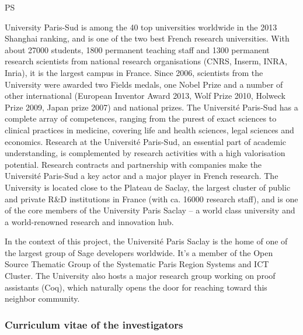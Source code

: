 \begin{sitedescription}{PS}

University Paris-Sud is among the 40 top universities worldwide in the
2013 Shanghai ranking, and is one of the two best French research
universities. With about 27000 students, 1800 permanent teaching staff
and 1300 permanent research scientists from national research
organisations (CNRS, Inserm, INRA, Inria), it is the largest campus in
France. Since 2006, scientists from the University were awarded two
Fields medals, one Nobel Prize and a number of other international
(European Inventor Award 2013, Wolf Prize 2010, Holweck Prize 2009,
Japan prize 2007) and national prizes.  The Université Paris-Sud has a
complete array of competences, ranging from the purest of exact
sciences to clinical practices in medicine, covering life and health
sciences, legal sciences and economics. Research at the Université
Paris-Sud, an essential part of academic understanding, is
complemented by research activities with a high valorisation
potential. Research contracts and partnership with companies make the
Université Paris-Sud a key actor and a major player in French
research.  The University is located close to the Plateau de Saclay,
the largest cluster of public and private R\&D institutions in France
(with ca. 16000 research staff), and is one of the core members of the
University Paris Saclay – a world class university and a
world-renowned research and innovation hub.

In the context of this project, the Université Paris Saclay is the
home of one of the largest group of Sage developers worldwide. It's a
member of the Open Source Thematic Group of the Systematic Paris
Region Systems and ICT Cluster. The University also hosts a major
research group working on proof assistants (Coq), which naturally
opens the door for reaching toward this neighbor community.


\subsubsection*{Curriculum vitae of the investigators}


%



%


\end{sitedescription}
